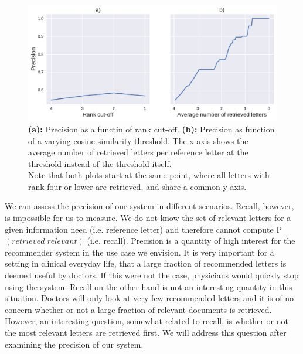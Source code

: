 \begin{figure}
	\includegraphics[width=\linewidth]{figures/precision_rank_sim}
	\caption{\textbf{(a):} Precision as a functin of rank cut-off. \textbf{(b):} Precision as function of a varying cosine similarity threshold. The x-axis shows the average number of retrieved letters per reference letter at the threshold instead of the threshold itself.\\
	Note that both plots start at the same point, where all letters with rank four or lower are retrieved, and share a common y-axis.}
	\label{fig:precision}
\end{figure}

We can assess the precision of our system in different scenarios. Recall, however, is impossible for us to measure. We do not know the set of relevant letters for a given information need (i.e. reference letter) and therefore cannot compute P$(retrieved|relevant)$ (i.e. recall). Precision is a quantity of high interest for the recommender system in the use case we envision. It is very important for a setting in clinical everyday life, that a large fraction of recommended letters is deemed useful by doctors. If this were not the case, physicians would quickly stop using the system. Recall on the other hand is not an interesting quantity in this situation. Doctors will only look at very few recommended letters and it is of no concern whether or not a large fraction of relevant documents is retrieved. However, an interesting question, somewhat related to recall, is whether or not the most relevant letters are retrieved first. We will address this question after examining the precision of our system.

